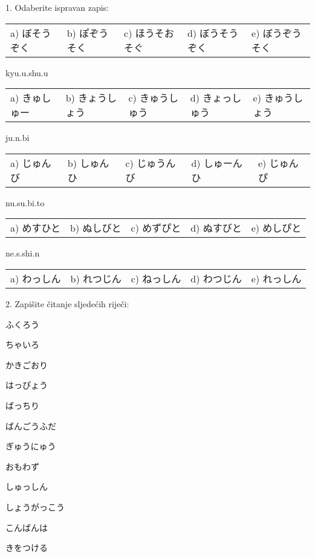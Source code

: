 \begin{mondai}{1. Odaberite ispravan zapis:}
		\begin{tabular}{l l l l l}
			a) ぼそうぞく & b) ぽぞうそく & c) ほうそおそぐ & d) ぼうそうぞく & e) ぼうぞうそく\\
		\end{tabular}
		\item kyu.u.shu.u\\ %
		\begin{tabular}{l l l l l}
			a) きゅしゅー & b) きょうしょう & c) きゅうしゅう & d) きょっしゅう & e) きゅうしょう\\
		\end{tabular}
		\item ju.n.bi\\ %
		\begin{tabular}{l l l l l}
			a) じゅんび & b) しゅんひ & c) じゅうんび & d) しゅーんひ & e) じゅんぴ\\
		\end{tabular}
		\item nu.su.bi.to\\ %
		\begin{tabular}{l l l l l}
			a) めすひと & b) ぬしびと & c) めずぴと & d) ぬすびと & e) めしぴと\\
		\end{tabular}
		\item ne.s.shi.n\\ %
		\begin{tabular}{l l l l l}
			a) わっしん & b) れつじん & c) ねっしん & d) わつじん & e) れっしん\\
		\end{tabular}
	\end{mondai}

	\begin{mondai}{2. Zapišite čitanje sljedećih riječi:}
		\item ふくろう
		\item ちゃいろ
		\item かきごおり
		\item はっぴょう
		\item ばっちり
		\item ばんごうふだ
		\item ぎゅうにゅう
		\item おもわず
		\item しゅっしん
		\item しょうがっこう
		\item こんばんは
		\item きをつける
	\end{mondai}

